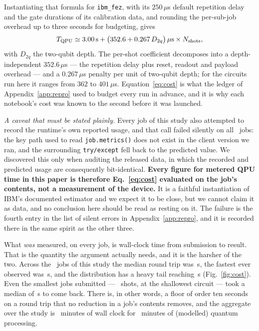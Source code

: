 \documentclass[aps,prx,preprint,superscriptaddress,nofootinbib,longbibliography]{revtex4-2}
\newcommand{\ibmfez}{\texttt{ibm\_fez}}
\newcommand{\Dtwoq}{D_{2q}}
\begin{document}
Instantiating that formula for \ibmfez, with its $250\,\mu$s default repetition delay and the
gate durations of its calibration data, and rounding the per-sub-job overhead up to three
seconds for budgeting, gives
\begin{equation}
  T_{\rm QPU} \simeq 3.00\,\text{s} + \big(352.6 + 0.267\,\Dtwoq\big)\,\mu\text{s}
                \times N_{\rm shots},
  \label{eq:cost}
\end{equation}
with $\Dtwoq$ the two-qubit depth. The per-shot coefficient decomposes into a depth-independent
$352.6\,\mu$s --- the repetition delay plus reset, readout and payload overhead --- and a
$0.267\,\mu$s penalty per unit of two-qubit depth; for the circuits run here it ranges from
$362$ to $401\,\mu$s. Equation~\eqref{eq:cost} is what the ledger of Appendix~\ref{app:repro}
used to budget every run in advance, and it is why each notebook's cost was known to the second
before it was launched.

\emph{A caveat that must be stated plainly.} Every job of this study also attempted to record
the runtime's own reported usage, and that call failed silently on all \alljobs\ jobs: the key
path used to read \texttt{job.metrics()} does not exist in the client version we ran, and the
surrounding \texttt{try/except} fell back to the predicted value. We discovered this only when
auditing the released data, in which the recorded and predicted usage are consequently
bit-identical. \textbf{Every figure for metered QPU time in this paper is therefore
Eq.~\eqref{eq:cost} evaluated on the job's contents, not a measurement of the device.} It is a
faithful instantiation of IBM's documented estimator and we expect it to be close, but we
cannot claim it as data, and no conclusion here should be read as resting on it. The failure is
the fourth entry in the list of silent errors in Appendix~\ref{app:repro}, and it is recorded
there in the same spirit as the other three.

What \emph{was} measured, on every job, is wall-clock time from submission to result. That is
the quantity the argument actually needs, and it is the harsher of the two. Across the
\alljobs\ jobs of this study the median round trip was \medianwall\,s, the fastest ever
observed was \minwall\,s, and the distribution has a heavy tail reaching \maxwall\,s
(Fig.~\ref{fig:cost}). Even the smallest jobs submitted --- \minshots\ shots, at the shallowest
circuit --- took a median of \medianwallsmall\,s to come back. There is, in other words, a
floor of order ten seconds on a round trip that no reduction in a job's contents removes, and
the aggregate over the study is \allwallmin\ minutes of wall clock for \allqpumin\ minutes of
(modelled) quantum processing.
\end{document}
